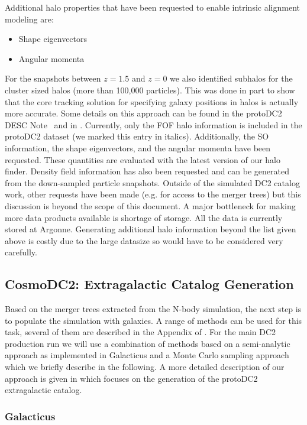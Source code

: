 \documentclass[preprint,times]{aastex61}
\begin{document}
Additional halo properties that have been requested to enable intrinsic alignment modeling are:
\begin{itemize}
\item Shape eigenvectors
\item Angular momenta
\end{itemize}
For the snapshots between $z=1.5$ and $z=0$ we also identified subhalos for the cluster sized halos (more than 100,000 particles). This was done in part to show that the core tracking solution for specifying galaxy positions in halos is actually more accurate. Some details on this approach can be found in the protoDC2 DESC Note~\citep{protoDC2} and in \cite{korytov}. Currently, only the FOF halo information is included in the protoDC2 dataset (we marked this entry in italics). Additionally, the SO information, the shape eigenvectors, and the angular momenta have been requested. These quantities are evaluated with the latest version of our halo finder. Density field information has also been requested and can be generated from the down-sampled particle snapshots. Outside of the simulated DC2 catalog work, other requests have been made (e.g. for access to the merger trees) but this discussion is beyond the scope of this document. A major bottleneck for making more data products available is shortage of storage. All the data is currently stored at Argonne. Generating additional halo information beyond the list given above is costly due to the large datasize so would have to be considered very carefully. 

\subsection{CosmoDC2: Extragalactic Catalog Generation}
\label{sec:mocks}
Based on the merger trees extracted from the N-body simulation, the next step is to populate the simulation with galaxies. A range of methods can be used for this task, several of them are described in the Appendix of \cite{descqa}. For the main DC2 production run we will use a combination of methods based on a semi-analytic approach as implemented in Galacticus and a Monte Carlo sampling approach which we briefly describe in the following.
A more detailed description of our approach is given in \cite{protoDC2} which focuses on the generation of the protoDC2 extragalactic catalog.

\subsubsection{Galacticus}
\end{document}
